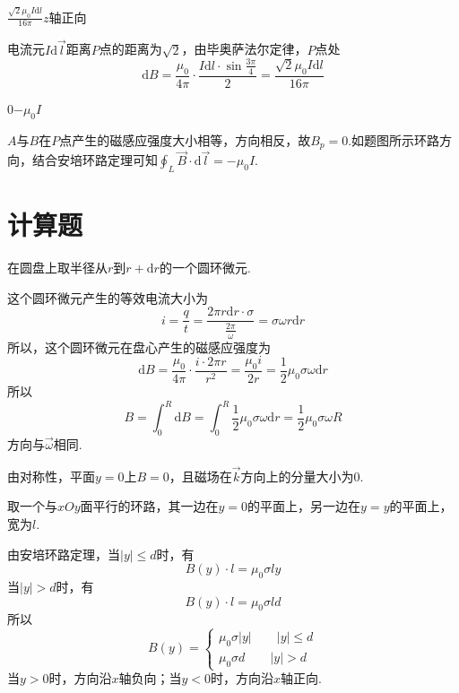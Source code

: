 \documentclass[b5paper,opensource,sourcefont,parskip]{qyxf-book}
\newcommand{\di}[1]{\mathrm{d}#1}
\begin{document}
 $\frac{\sqrt{2}\mu_0I\di l}{16\pi}$\quad $z$轴正向

\solve
电流元$I\di\vec{l}$距离$P$点的距离为$\sqrt{2}$，由毕奥萨法尔定律，$P$点处
\begin{equation*}
\di B=\frac{\mu_0}{4\pi}\cdot\frac{I\di l\cdot\sin\frac{3\pi}{4}}{2}=\frac{\sqrt{2}\mu_0I\di l}{16\pi}
\end{equation*}

 0\quad$-\mu_0 I$

\analysis
$A$与$B$在$P$点产生的磁感应强度大小相等，方向相反，故$B_p=0$.如题图所示环路方向，结合安培环路定理可知$\oint_L\vec{B}\cdot\di\vec{l}=-\mu_0 I$.

\section{计算题}

\solve
在圆盘上取半径从$r$到$r+\di r$的一个圆环微元.

这个圆环微元产生的等效电流大小为
\begin{equation*}
i=\frac{q}{t}=\frac{2\pi r\di r\cdot\sigma}{\frac{2\pi}{\omega}}=\sigma\omega r\di r
\end{equation*}
所以，这个圆环微元在盘心产生的磁感应强度为
\begin{equation*}
\di B=\frac{\mu_0}{4\pi}\cdot\frac{i\cdot2\pi r}{r^2}=\frac{\mu_0i}{2r}=\frac{1}{2}\mu_0\sigma\omega\di r
\end{equation*}
所以
\begin{equation*}
B=\int_0^R\di B=\int_0^R\frac{1}{2}\mu_0\sigma\omega\di r=\frac{1}{2}\mu_0\sigma\omega R
\end{equation*}
方向与$\vec{\omega}$相同.


\solve 
由对称性，平面$y=0$上$B=0$，且磁场在$\vec{k}$方向上的分量大小为$0$.

取一个与$xOy$面平行的环路，其一边在$y=0$的平面上，另一边在$y=y$的平面上，宽为$l$.

由安培环路定理，当$|y|\le d$时，有
\begin{equation*}
B(y)\cdot l=\mu_0\sigma ly
\end{equation*}
当$|y|>d$时，有
\begin{equation*}
B(y)\cdot l=\mu_0\sigma ld
\end{equation*}
所以
\begin{equation*}
B(y)=
\begin{cases}
\mu_0\sigma|y|\qquad|y|\le d\\
\mu_0\sigma d\qquad|y|>d
\end{cases}
\end{equation*}
当$y>0$时，方向沿$x$轴负向；当$y<0$时，方向沿$x$轴正向.
\end{document}
